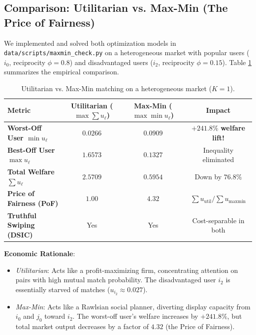 \documentclass[11pt,letterpaper]{article}
\theoremstyle{definition}
\theoremstyle{plain}
\theoremstyle{remark}
\begin{document}
\subsection{Comparison: Utilitarian vs. Max-Min (The Price of Fairness)}
We implemented and solved both optimization models in \texttt{data/scripts/maxmin\_check.py} on a heterogeneous market with popular users ($i_0$, reciprocity $\phi = 0.8$) and disadvantaged users ($i_2$, reciprocity $\phi = 0.15$). Table \ref{tab:maxmin_comp} summarizes the empirical comparison.

\begin{table}[ht]
\centering
\begin{tabular}{@{}lccc@{}}
\toprule
Metric & Utilitarian ($\max \sum u_\ell$) & Max-Min ($\max \min u_\ell$) & Impact \\
\midrule
\textbf{Worst-Off User $\min u_\ell$} & $\mathbf{0.0266}$ & $\mathbf{0.0909}$ & $\mathbf{+241.8\%}$ \textbf{welfare lift!} \\
\textbf{Best-Off User $\max u_\ell$} & $1.6573$ & $0.1327$ & Inequality eliminated \\
\textbf{Total Welfare $\sum u_\ell$} & $\mathbf{2.5709}$ & $\mathbf{0.5954}$ & Down by $76.8\%$ \\
\textbf{Price of Fairness (PoF)} & $1.00$ & $\mathbf{4.32}$ & $\sum u_{\text{util}} / \sum u_{\text{maxmin}}$ \\
\textbf{Truthful Swiping (DSIC)} & Yes & Yes & Cost-separable in both \\
\bottomrule
\end{tabular}
\caption{Utilitarian vs. Max-Min matching on a heterogeneous market ($K=1$).}
\label{tab:maxmin_comp}
\end{table}

\noindent \textbf{Economic Rationale}:
\begin{itemize}[leftmargin=2em]
    \item \emph{Utilitarian}: Acts like a profit-maximizing firm, concentrating attention on pairs with high mutual match probability. The disadvantaged user $i_2$ is essentially starved of matches ($u_{i_2} \approx 0.027$).
    \item \emph{Max-Min}: Acts like a Rawlsian social planner, diverting display capacity from $i_0$ and $j_0$ toward $i_2$. The worst-off user's welfare increases by $+241.8\%$, but total market output decreases by a factor of $4.32$ (the Price of Fairness).
\end{itemize}
\end{document}
